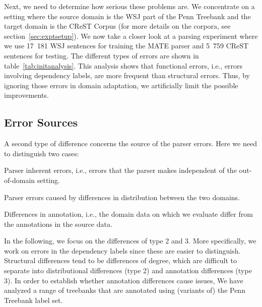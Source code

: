 Next, we need to determine how serious these problems are. We concentrate on a setting where the source domain is the WSJ part of the Penn Treebank \cite{Marcus:1994:PTA:1075812.1075835} and the target domain is the CReST Corpus \cite{eberhard2010indiana} (for more details on the corpora, see section~\ref{sec:exptsetup}). We now take a closer look at a parsing experiment where we use 17~181 WSJ sentences for training the MATE parser and 5~759 CReST sentences for testing. The different types of errors are shown in table~\ref{tab:initanalysis}.
This analysis shows that functional errors, i.e., errors involving dependency labels, are more frequent than structural errors. Thus, by ignoring those errors in domain adaptation, we artificially limit the possible improvements.


\subsection{Error Sources}

A second type of difference concerns the source of the parser errors. Here we need to distinguish two cases:

\begin{compactenum}
    \item Parser inherent errors, i.e., errors that the parser makes independent of the out-of-domain setting.
    \item  Parser errors caused by differences in distribution between the two domains.
    \item Differences in annotation, i.e., the domain data on which we evaluate differ from the annotations in the source data.
\end{compactenum}

In the following, we focus on the differences of type 2 and 3. More specifically, we work on errors in the dependency labels since these are easier to distinguish. Structural differences tend to be differences of degree, which are difficult to separate into distributional differences (type 2) and annotation differences (type 3). In order to establish whether annotation differences cause issues, We have analyzed a range of treebanks that are annotated using (variants of) the Penn Treebank label set. %

